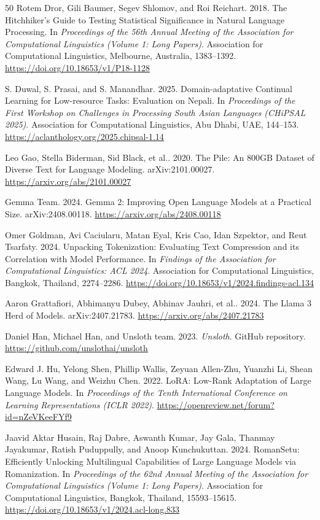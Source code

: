 \documentclass{article}
\begin{document}
\begin{thebibliography}{50}
Rotem Dror, Gili Baumer, Segev Shlomov, and Roi Reichart. 2018. The Hitchhiker's Guide to Testing Statistical Significance in Natural Language Processing. In \emph{Proceedings of the 56th Annual Meeting of the Association for Computational Linguistics (Volume 1: Long Papers)}. Association for Computational Linguistics, Melbourne, Australia, 1383–1392. \url{https://doi.org/10.18653/v1/P18-1128}

S. Duwal, S. Prasai, and S. Manandhar. 2025. Domain-adaptative Continual Learning for Low-resource Tasks: Evaluation on Nepali. In \emph{Proceedings of the First Workshop on Challenges in Processing South Asian Languages (CHiPSAL 2025)}. Association for Computational Linguistics, Abu Dhabi, UAE, 144–153. \url{https://aclanthology.org/2025.chipsal-1.14}

Leo Gao, Stella Biderman, Sid Black, et al.. 2020. The Pile: An 800GB Dataset of Diverse Text for Language Modeling. arXiv:2101.00027. \url{https://arxiv.org/abs/2101.00027}

Gemma Team. 2024. Gemma 2: Improving Open Language Models at a Practical Size. arXiv:2408.00118. \url{https://arxiv.org/abs/2408.00118}

Omer Goldman, Avi Caciularu, Matan Eyal, Kris Cao, Idan Szpektor, and Reut Tsarfaty. 2024. Unpacking Tokenization: Evaluating Text Compression and its Correlation with Model Performance. In \emph{Findings of the Association for Computational Linguistics: ACL 2024}. Association for Computational Linguistics, Bangkok, Thailand, 2274–2286. \url{https://doi.org/10.18653/v1/2024.findings-acl.134}

Aaron Grattafiori, Abhimanyu Dubey, Abhinav Jauhri, et al.. 2024. The Llama 3 Herd of Models. arXiv:2407.21783. \url{https://arxiv.org/abs/2407.21783}

Daniel Han, Michael Han, and Unsloth team. 2023. \emph{Unsloth}. GitHub repository. \url{https://github.com/unslothai/unsloth}

Edward J. Hu, Yelong Shen, Phillip Wallis, Zeyuan Allen-Zhu, Yuanzhi Li, Shean Wang, Lu Wang, and Weizhu Chen. 2022. LoRA: Low-Rank Adaptation of Large Language Models. In \emph{Proceedings of the Tenth International Conference on Learning Representations (ICLR 2022)}. \url{https://openreview.net/forum?id=nZeVKeeFYf9}

Jaavid Aktar Husain, Raj Dabre, Aswanth Kumar, Jay Gala, Thanmay Jayakumar, Ratish Puduppully, and Anoop Kunchukuttan. 2024. RomanSetu: Efficiently Unlocking Multilingual Capabilities of Large Language Models via Romanization. In \emph{Proceedings of the 62nd Annual Meeting of the Association for Computational Linguistics (Volume 1: Long Papers)}. Association for Computational Linguistics, Bangkok, Thailand, 15593–15615. \url{https://doi.org/10.18653/v1/2024.acl-long.833}


\end{thebibliography}
\end{document}
